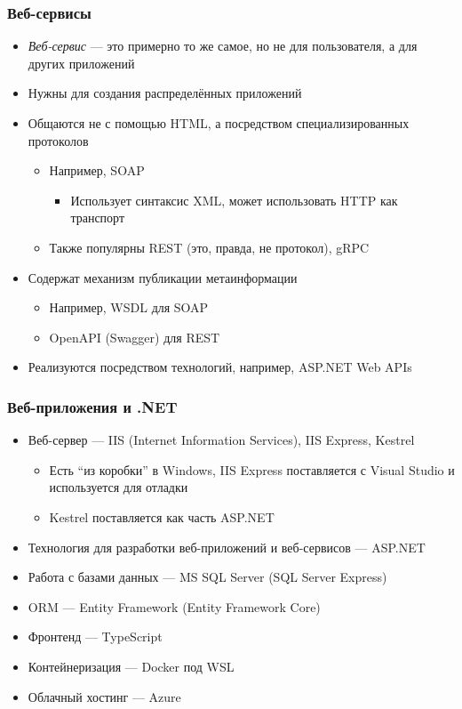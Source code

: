 \documentclass{../../slides-style}
\begin{document}
    \begin{frame}
        \frametitle{Веб-сервисы}
        \begin{itemize}
            \item \textit{Веб-сервис} --- это примерно то же самое, но не для пользователя, а для других приложений
            \item Нужны для создания распределённых приложений
            \item Общаются не с помощью HTML, а посредством специализированных протоколов
            \begin{itemize}
                \item Например, SOAP
                \begin{itemize}
                    \item Использует синтаксис XML, может использовать HTTP как транспорт
                \end{itemize}
                \item Также популярны REST (это, правда, не протокол), gRPC
            \end{itemize}
            \item Содержат механизм публикации метаинформации
            \begin{itemize}
                \item Например, WSDL для SOAP
                \item OpenAPI (Swagger) для REST
            \end{itemize}
            \item Реализуются посредством технологий, например, ASP.NET Web APIs
        \end{itemize}
    \end{frame}

    \begin{frame}
        \frametitle{Веб-приложения и .NET}
        \begin{itemize}
            \item Веб-сервер --- IIS (Internet Information Services), IIS Express, Kestrel
            \begin{itemize}
                \item Есть ``из коробки'' в Windows, IIS Express поставляется с Visual Studio и используется для отладки
                \item Kestrel поставляется как часть ASP.NET
            \end{itemize}
            \item Технология для разработки веб-приложений и веб-сервисов --- ASP.NET
            \item Работа с базами данных --- MS SQL Server (SQL Server Express)
            \item ORM --- Entity Framework (Entity Framework Core)
            \item Фронтенд --- TypeScript
            \item Контейнеризация --- Docker под WSL
            \item Облачный хостинг --- Azure
        \end{itemize}
    \end{frame}
\end{document}
